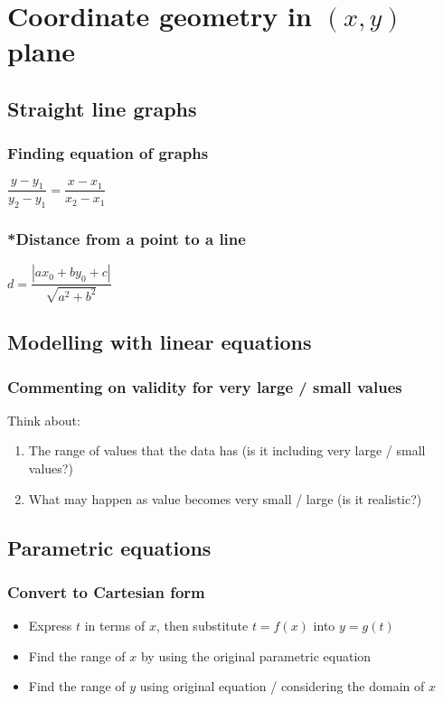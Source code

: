 \documentclass[A4paper]{article}
\begin{document}
	\pagebreak

	\section{Coordinate geometry in $(x,y)$ plane}
	
	\subsection{Straight line graphs}
	\subsubsection{Finding equation of graphs}
	$\dfrac{y-y_1}{y_2-y_1}=\dfrac{x-x_1}{x_2-x_1}$
	
	\subsubsection[]{*Distance from a point to a line}
	$d=\dfrac{|ax_0+by_0+c|}{\sqrt{a^2+b^2}}$\\
	
	\subsection{Modelling with linear equations}
	\subsubsection{Commenting on validity for very large / small values}
	Think about:
	\begin{enumerate}
		\item The range of values that the data has (is it including very large / small values?)
		\item What may happen as value becomes very small / large (is it realistic?)
	\end{enumerate}

	\subsection{Parametric equations}
	\subsubsection{Convert to Cartesian form}
	\begin{itemize}
		\item Express $t$ in terms of $x$, then substitute $t=f(x)$ into $y=g(t)$
		\item Find the range of $x$ by using the original parametric equation
		\item Find the range of $y$ using original equation / considering the domain of $x$
	\end{itemize}
\end{document}
